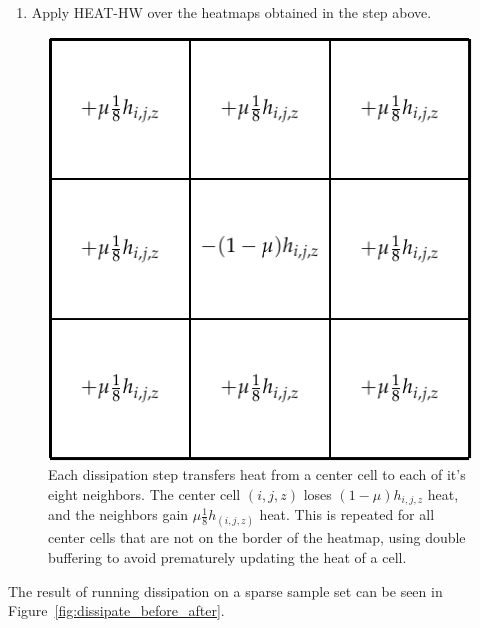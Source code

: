 \documentclass[11pt, oneside]{report}
\begin{document}
{\begin{enumerate}
\item Apply HEAT-HW over the heatmaps obtained in the step above. 

\end{enumerate}


\begin{figure}
\centering
\includegraphics[scale=1]{figs-tileheat/disspate2}
\caption{Each dissipation step transfers heat from a center cell to each of it's eight neighbors. The center cell $(i,j,z)$ loses $(1 - \mu) h_{i,j,z}$ heat, and the neighbors gain $\mu \frac{1}{8} h_(i,j,z)$ heat. This is repeated for all center cells that are not on the border of the heatmap, using double buffering to avoid prematurely updating the heat of a cell.}
\label{fig:dissipate}
\end{figure}

The result of running dissipation on a sparse sample set can be seen in Figure~\ref{fig:dissipate_before_after}.

}
\end{document}
